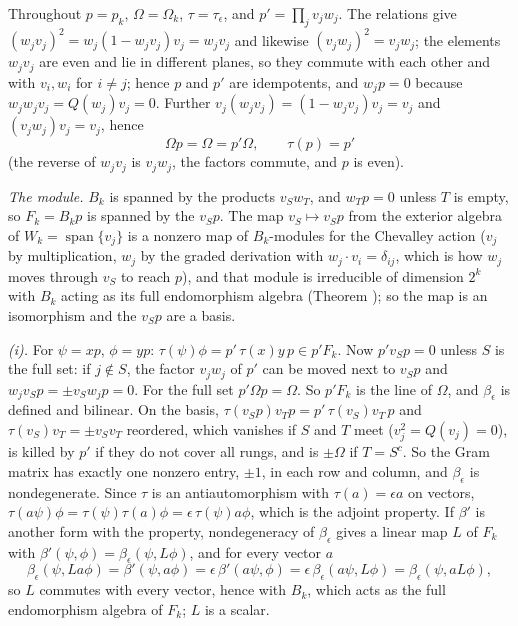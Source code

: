 Throughout $p = p_{k}$, $\Omega = \Omega_{k}$, $\tau = \tau_{\epsilon}$, and $p' = \prod_{j}v_{j}w_{j}$. The relations give $(w_{j}v_{j})^{2} = w_{j}(1 - w_{j}v_{j})v_{j} = w_{j}v_{j}$ and likewise $(v_{j}w_{j})^{2} = v_{j}w_{j}$; the elements $w_{j}v_{j}$ are even and lie in different planes, so they commute with each other and with $v_{i}, w_{i}$ for $i \ne j$; hence $p$ and $p'$ are idempotents, and $w_{j}p = 0$ because $w_{j}w_{j}v_{j} = Q(w_{j})v_{j} = 0$. Further $v_{j}(w_{j}v_{j}) = (1 - w_{j}v_{j})v_{j} = v_{j}$ and $(v_{j}w_{j})v_{j} = v_{j}$, hence
\[
\Omega p = \Omega = p'\Omega, \qquad \tau(p) = p'
\]
(the reverse of $w_{j}v_{j}$ is $v_{j}w_{j}$, the factors commute, and $p$ is even).

\emph{The module.} $B_{k}$ is spanned by the products $v_{S}w_{T}$, and $w_{T}p = 0$ unless $T$ is empty, so $F_{k} = B_{k}p$ is spanned by the $v_{S}p$. The map $v_{S} \mapsto v_{S}p$ from the exterior algebra of $W_{k} = \operatorname{span}\{v_{j}\}$ is a nonzero map of $B_{k}$-modules for the Chevalley action ($v_{j}$ by multiplication, $w_{j}$ by the graded derivation with $w_{j}\cdot v_{i} = \delta_{ij}$, which is how $w_{j}$ moves through $v_{S}$ to reach $p$), and that module is irreducible of dimension $2^{k}$ with $B_{k}$ acting as its full endomorphism algebra (Theorem ); so the map is an isomorphism and the $v_{S}p$ are a basis.

\emph{(i).} For $\psi = xp$, $\phi = yp$: $\tau(\psi)\phi = p'\,\tau(x)y\,p \in p'F_{k}$. Now $p'v_{S}p = 0$ unless $S$ is the full set: if $j \notin S$, the factor $v_{j}w_{j}$ of $p'$ can be moved next to $v_{S}p$ and $w_{j}v_{S}p = \pm v_{S}w_{j}p = 0$. For the full set $p'\Omega p = \Omega$. So $p'F_{k}$ is the line of $\Omega$, and $\beta_{\epsilon}$ is defined and bilinear. On the basis, $\tau(v_{S}p)v_{T}p = p'\,\tau(v_{S})v_{T}\,p$ and $\tau(v_{S})v_{T} = \pm v_{S}v_{T}$ reordered, which vanishes if $S$ and $T$ meet ($v_{j}^{2} = Q(v_{j}) = 0$), is killed by $p'$ if they do not cover all rungs, and is $\pm\Omega$ if $T = S^{c}$. So the Gram matrix has exactly one nonzero entry, $\pm 1$, in each row and column, and $\beta_{\epsilon}$ is nondegenerate. Since $\tau$ is an antiautomorphism with $\tau(a) = \epsilon a$ on vectors, $\tau(a\psi)\phi = \tau(\psi)\tau(a)\phi = \epsilon\,\tau(\psi)a\phi$, which is the adjoint property. If $\beta'$ is another form with the property, nondegeneracy of $\beta_{\epsilon}$ gives a linear map $L$ of $F_{k}$ with $\beta'(\psi, \phi) = \beta_{\epsilon}(\psi, L\phi)$, and for every vector $a$
\[
\beta_{\epsilon}(\psi, La\phi) = \beta'(\psi, a\phi) = \epsilon\,\beta'(a\psi, \phi) = \epsilon\,\beta_{\epsilon}(a\psi, L\phi) = \beta_{\epsilon}(\psi, aL\phi),
\]
so $L$ commutes with every vector, hence with $B_{k}$, which acts as the full endomorphism algebra of $F_{k}$; $L$ is a scalar.

